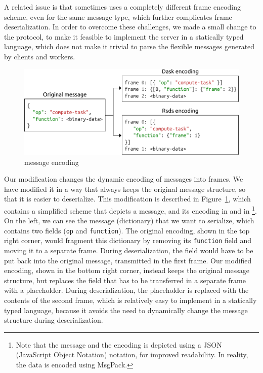A related issue is that \dask{} sometimes uses a completely different frame
encoding scheme, even for the same message type, which further complicates frame deserialization.
In order to overcome these challenges, we made a small change to the \dask{}
protocol, to make it feasible to implement the server in a statically typed language, which does
not make it trivial to parse the flexible messages generated by \dask{} clients
and workers.

\begin{figure}
	\centering
	\includegraphics[width=0.9\columnwidth]{./imgs/rsds/frame-encoding}
	\caption{\dask{} message encoding}
	\label{fig:rsds-dask-frame-encoding}
\end{figure}

Our modification changes the dynamic encoding of \dask{} messages into frames.
We have modified it in a way that always keeps the original message structure, so that it is easier
to deserialize. This modification is described in Figure~\ref{fig:rsds-dask-frame-encoding}, which
contains a simplified scheme that depicts a \dask{} message, and its encoding
in \dask{} and in \rsds{}\footnote{Note that the message and the encoding is depicted using a JSON (JavaScript Object Notation)
notation, for improved readability. In reality, the data is encoded using MsgPack.}. On
the left, we can see the message (dictionary) that we want to serialize, which contains two fields
(\texttt{op} and \texttt{function}). The original
\dask{} encoding, shown in the top right corner, would fragment this dictionary
by removing its \texttt{function} field and moving it to a separate frame. During
deserialization, the field would have to be put back into the original message, transmitted in the
first frame. Our modified encoding, shown in the bottom right corner, instead keeps the original
message structure, but replaces the field that has to be transferred in a separate frame with a
placeholder. During deserialization, the placeholder is replaced with the contents of the second
frame, which is relatively easy to implement in a statically typed language, because it avoids the
need to dynamically change the message structure during deserialization.

